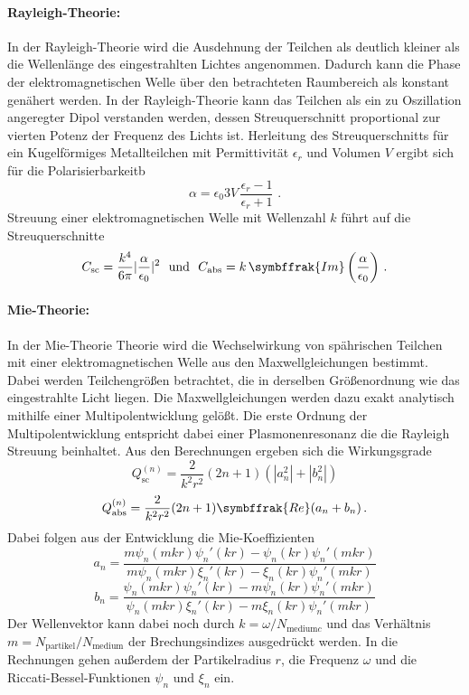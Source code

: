 \paragraph{Rayleigh-Theorie:}
In der Rayleigh-Theorie wird die Ausdehnung der Teilchen als deutlich kleiner als die Wellenlänge des eingestrahlten Lichtes angenommen. Dadurch kann die Phase der elektromagnetischen Welle über den betrachteten Raumbereich als konstant genähert werden. In der Rayleigh-Theorie kann das Teilchen als ein zu Oszillation angeregter Dipol verstanden werden, dessen Streuquerschnitt proportional zur vierten Potenz der Frequenz des Lichts ist. Herleitung des Streuquerschnitts für ein Kugelförmiges Metallteilchen mit Permittivität $\epsilon_r$  und Volumen $V$ ergibt sich für die Polarisierbarkeitb
\begin{equation}
  \alpha = \epsilon_0 3 V\, \frac{\epsilon_r-1}{\epsilon_r+1}\,\,.
  \label{eqn:polbarkeit}
\end{equation}
Streuung einer elektromagnetischen Welle mit Wellenzahl $k$ führt auf die Streuquerschnitte
\begin{equation}
  C_{\text{sc}} = \frac{k^4}{6\pi}|\frac{\alpha}{\epsilon_0}|^2 \,\,\,\, \text{und}\,\,\,\, C_{\text{abs}} = k\, \symbffrak{Im}\left(\frac{\alpha}{\epsilon_0}\right)\,.
  \label{eqn:rayleigh}
\end{equation}
\paragraph{Mie-Theorie:}
In der Mie-Theorie Theorie wird die Wechselwirkung von spährischen Teilchen mit einer elektromagnetischen Welle aus den Maxwellgleichungen bestimmt. Dabei werden Teilchengrößen betrachtet, die in derselben Größenordnung wie das eingestrahlte Licht liegen. Die Maxwellgleichungen werden dazu exakt analytisch mithilfe einer Multipolentwicklung gelößt. Die erste Ordnung der Multipolentwicklung entspricht dabei einer Plasmonenresonanz die die Rayleigh Streuung beinhaltet. Aus den Berechnungen ergeben sich die Wirkungsgrade
\begin{equation}
  Q^{(n)}_{\text{sc}} = \frac{2}{k^2r^2} (2n+1)(|a_n^2| + |b_n^2|)
  \label{eqn:sc}
\end{equation}
\begin{equation}
  Q^{(n)}_{\text{abs}} = \frac{2}{k^2r^2} (2n+1) \symbffrak{Re}(a_n+b_n)\,.
  \label{eqn:abs}
\end{equation}
Dabei folgen aus der Entwicklung die Mie-Koeffizienten
\begin{equation}
  a_n = \frac{m\psi_n(mkr)\psi_n'(kr)-\psi_n(kr)\psi_n'(mkr)}{m\psi_n(mkr)\xi_n'(kr)-\xi_n(kr)\psi_n'(mkr)}
\end{equation}
\begin{equation}
  b_n = \frac{\psi_n(mkr)\psi_n'(kr)-m\psi_n(kr)\psi_n'(mkr)}{\psi_n(mkr)\xi_n'(kr)-m\xi_n(kr)\psi_n'(mkr)}
\end{equation}
Der Wellenvektor kann dabei noch durch  $k=\omega/N_{\text{medium} c}$ und das Verhältnis $m = N_\text{partikel}/N_\text{medium}$ der Brechungsindizes ausgedrückt werden. In die Rechnungen gehen außerdem der Partikelradius $r$, die Frequenz $\omega$ und die Riccati-Bessel-Funktionen $\psi_n$ und $\xi_n$ ein.
